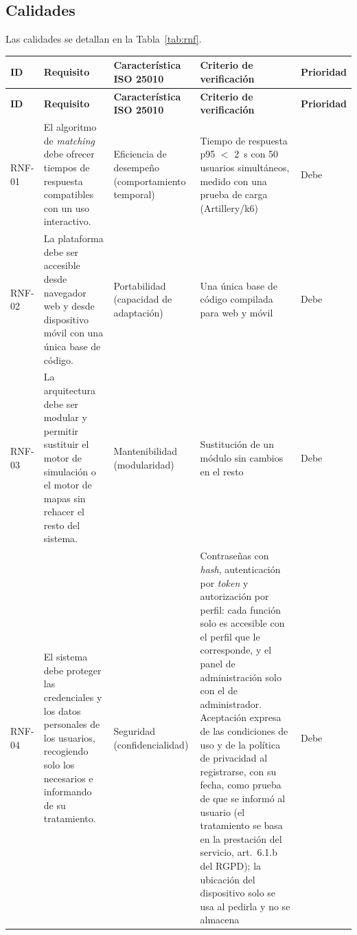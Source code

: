 \subsection{Calidades}
\label{sec:calidades}

Las calidades se detallan en la Tabla~\ref{tab:rnf}.

\setlength{\tabcolsep}{4pt}
\begin{longtable}{@{}>{\raggedright\arraybackslash}p{1.30cm} >{\raggedright\arraybackslash}p{4.90cm} >{\raggedright\arraybackslash}p{3.30cm} >{\raggedright\arraybackslash}p{3.55cm} >{\raggedright\arraybackslash}p{1.65cm}@{}}
  \hline
  \textbf{ID} & \textbf{Requisito} & \textbf{Característica ISO 25010} & \textbf{Criterio de verificación} & \textbf{Prioridad} \\
  \hline
  \endfirsthead
  \hline
  \textbf{ID} & \textbf{Requisito} & \textbf{Característica ISO 25010} & \textbf{Criterio de verificación} & \textbf{Prioridad} \\
  \hline
  \endhead
  RNF-01 & El algoritmo de \textit{matching} debe ofrecer tiempos de respuesta compatibles con un uso interactivo. & Eficiencia de desempeño (comportamiento temporal) & Tiempo de respuesta p95 $<$ 2~s con 50 usuarios simultáneos, medido con una prueba de carga (Artillery/k6) & Debe \\
  RNF-02 & La plataforma debe ser accesible desde navegador web y desde dispositivo móvil con una única base de código. & Portabilidad (capacidad de adaptación) & Una única base de código compilada para web y móvil & Debe \\
  RNF-03 & La arquitectura debe ser modular y permitir sustituir el motor de simulación o el motor de mapas sin rehacer el resto del sistema. & Mantenibilidad (modularidad) & Sustitución de un módulo sin cambios en el resto & Debe \\
  RNF-04 & El sistema debe proteger las credenciales y los datos personales de los usuarios, recogiendo solo los necesarios e informando de su tratamiento. & Seguridad (confidencialidad) & Contraseñas con \textit{hash}, autenticación por \textit{token} y autorización por perfil: cada función solo es accesible con el perfil que le corresponde, y el panel de administración solo con el de administrador. Aceptación expresa de las condiciones de uso y de la política de privacidad al registrarse, con su fecha, como prueba de que se informó al usuario (el tratamiento se basa en la prestación del servicio, art.~6.1.b del RGPD); la ubicación del dispositivo solo se usa al pedirla y no se almacena & Debe \\

\end{longtable}
